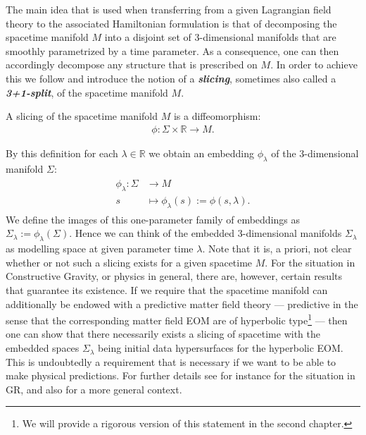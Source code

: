 The main idea that is used when transferring from a given Lagrangian field theory to the associated Hamiltonian formulation is that of decomposing the spacetime manifold $M$ into a disjoint set of 3-dimensional manifolds that are smoothly parametrized by a time parameter. As a consequence, one can then accordingly decompose any structure that is prescribed on $M$. In order to achieve this we follow \cite{2004math.ph..11032G} and introduce the notion of a \textit{\textbf{slicing}}, sometimes also called a \textit{\textbf{3+1-split}}, of the spacetime manifold $M$.
\begin{definition}[slicing]
A slicing of the spacetime manifold $M$ is a diffeomorphism: 
\begin{align}
\phi : \Sigma \times \mathbb{R} \longrightarrow M.
\end{align}
\end{definition}
By this definition for each $\lambda \in \mathbb{R}$ we obtain an embedding $\phi_{\lambda}$ of the 3-dimensional manifold $\Sigma$:
\begin{align}
\begin{aligned}
\phi_{\lambda}: \Sigma &\longrightarrow M \\
s &\longmapsto \phi_{\lambda}(s) := \phi(s,\lambda).
\end{aligned}
\end{align}
We define the images of this one-parameter family of embeddings as $\Sigma_{\lambda} := \phi_{\lambda}(\Sigma)$. Hence we can think of the embedded 3-dimensional manifolds $\Sigma_{\lambda}$ as modelling space at given parameter time $\lambda$.
Note that it is, a priori, not clear whether or not such a slicing exists for a given spacetime $M$. For the situation in Constructive Gravity, or physics in general, there are, however, certain results that guarantee its existence. If we require that the spacetime manifold can additionally be endowed with a predictive matter field theory --- predictive in the sense that the corresponding matter field EOM are of hyperbolic type\footnote{We will provide a rigorous version of this statement in the second chapter. } --- then one can show that there necessarily exists a slicing of spacetime with the embedded spaces $\Sigma_{\lambda}$ being initial data hypersurfaces for the hyperbolic EOM. This is undoubtedly a requirement that is necessary if we want to be able to make physical predictions. For further details see for instance \cite{2003CMaPh.243..461B} for the situation in GR, and also \cite{1996gere.conf...19G} for a more general context. 


